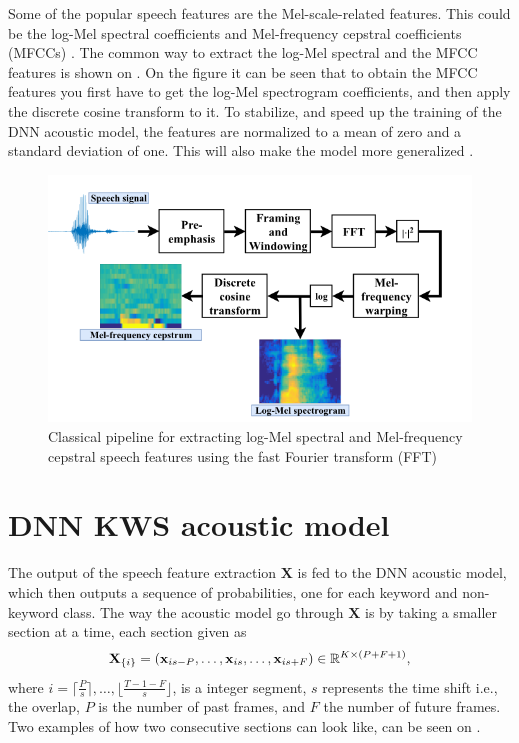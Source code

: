 Some of the popular speech features are the Mel-scale-related features. This could be the log-Mel spectral coefficients and Mel-frequency cepstral coefficients (MFCCs) \cite{lopez2021deep}. The common way to extract the log-Mel spectral and the MFCC features is shown on . On the figure it can be seen that to obtain the MFCC features you first have to get the log-Mel spectrogram coefficients, and then apply the discrete cosine transform to it. To stabilize, and speed up the training of the DNN acoustic model, the features are normalized to a mean of zero and a standard deviation of one. This will also make the model more generalized \cite{lopez2021deep}. 

\begin{figure}[h]
    \centering
    \includegraphics[width=\textwidth]{incl/img/kws/MFCC.png}
    \caption{ Classical pipeline for extracting log-Mel spectral and
    Mel-frequency cepstral speech features using the fast Fourier transform
    (FFT) \cite{lopez2021deep}}
    \label{fig:MFCC}
\end{figure}


\section{DNN KWS acoustic model}
The output of the speech feature extraction \(\textbf{X}\) is fed to the DNN acoustic model, which then outputs a sequence of probabilities, one for each keyword and non-keyword class. The way the acoustic model go through \(\textbf{X}\) is by taking a smaller section at a time, each section given as
\begin{align}
    \textbf{X}_{\{i\}} = \qty(\textbf{x}_{is-P}, \dots, \textbf{x}_{is}, \dots, \textbf{x}_{is+F}) \in \mathbb{R}^{K\times (P+F+1)},
\end{align} 
where \(i = \lceil \frac{P}{s} \rceil, \dots, \lfloor \frac{T-1-F}{s} \rfloor\), is a integer segment, \(s\) represents the time shift i.e., the overlap, \(P\) is the number of past frames, and \(F\) the number of future frames. Two examples of how two consecutive sections can look like, can be seen on . 

